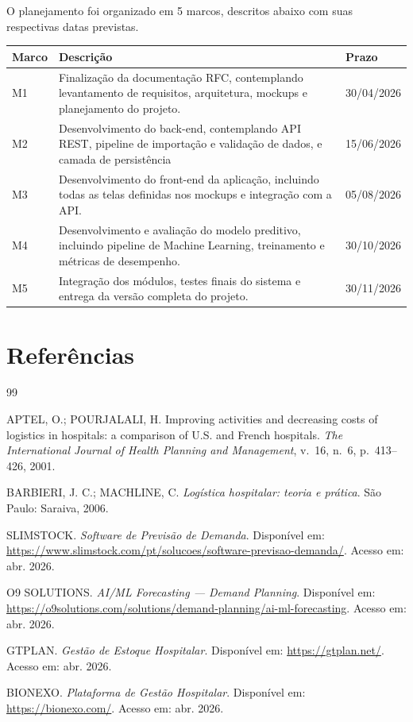 \documentclass[12pt,a4paper]{article}
\begin{document}
O planejamento foi organizado em 5 marcos, descritos abaixo com suas respectivas datas previstas.

\begin{center}
\begin{tabular}{p{} p{} p{}}
\toprule
\textbf{Marco} & \textbf{Descrição} & \textbf{Prazo} \\
\midrule
M1 & Finalização da documentação RFC, contemplando levantamento de requisitos, arquitetura, mockups e planejamento do projeto. & 30/04/2026 \\
\midrule
M2 & Desenvolvimento do back-end, contemplando API REST, pipeline de importação e validação de dados, e camada de persistência & 15/06/2026 \\
\midrule
M3 & Desenvolvimento do front-end da aplicação, incluindo todas as telas definidas nos mockups e integração com a API. & 05/08/2026 \\
\midrule
M4 & Desenvolvimento e avaliação do modelo preditivo, incluindo pipeline de Machine Learning, treinamento e métricas de desempenho. & 30/10/2026 \\
\midrule
M5 & Integração dos módulos, testes finais do sistema e entrega da versão completa do projeto. & 30/11/2026 \\
\bottomrule
\end{tabular}
\end{center}

\section{Referências}

\begin{thebibliography}{99}

APTEL, O.; POURJALALI, H. Improving activities and decreasing costs of logistics in
hospitals: a comparison of U.S. and French hospitals. \textit{The International Journal
of Health Planning and Management}, v.~16, n.~6, p.~413--426, 2001.

BARBIERI, J. C.; MACHLINE, C. \textit{Logística hospitalar: teoria e prática}.
São Paulo: Saraiva, 2006.

SLIMSTOCK. \textit{Software de Previsão de Demanda}. Disponível em:
\url{https://www.slimstock.com/pt/solucoes/software-previsao-demanda/}.
Acesso em: abr. 2026.

O9 SOLUTIONS. \textit{AI/ML Forecasting --- Demand Planning}. Disponível em:
\url{https://o9solutions.com/solutions/demand-planning/ai-ml-forecasting}.
Acesso em: abr. 2026.

GTPLAN. \textit{Gestão de Estoque Hospitalar}. Disponível em:
\url{https://gtplan.net/}. Acesso em: abr. 2026.

BIONEXO. \textit{Plataforma de Gestão Hospitalar}. Disponível em:
\url{https://bionexo.com/}. Acesso em: abr. 2026.

\end{thebibliography}
\end{document}
